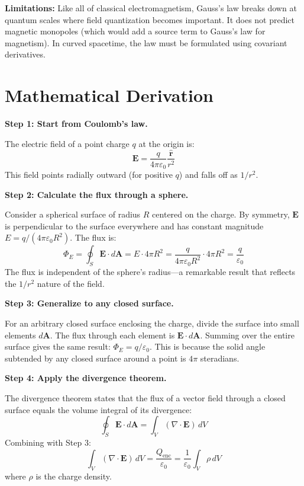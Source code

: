 \textbf{Limitations:} Like all of classical electromagnetism, Gauss's law breaks down at quantum scales where field quantization becomes important. It does not predict magnetic monopoles (which would add a source term to Gauss's law for magnetism). In curved spacetime, the law must be formulated using covariant derivatives.

\section*{Mathematical Derivation}

\textbf{Step 1: Start from Coulomb's law.}

The electric field of a point charge $q$ at the origin is:
\begin{equation}
\mathbf{E} = \frac{q}{4\pi\varepsilon_0} \frac{\mathbf{\hat{r}}}{r^2}
\end{equation}
This field points radially outward (for positive $q$) and falls off as $1/r^2$.

\textbf{Step 2: Calculate the flux through a sphere.}

Consider a spherical surface of radius $R$ centered on the charge. By symmetry, $\mathbf{E}$ is perpendicular to the surface everywhere and has constant magnitude $E = q/(4\pi\varepsilon_0 R^2)$. The flux is:
\begin{equation}
\Phi_E = \oint_S \mathbf{E} \cdot d\mathbf{A} = E \cdot 4\pi R^2 = \frac{q}{4\pi\varepsilon_0 R^2} \cdot 4\pi R^2 = \frac{q}{\varepsilon_0}
\end{equation}
The flux is independent of the sphere's radius---a remarkable result that reflects the $1/r^2$ nature of the field.

\textbf{Step 3: Generalize to any closed surface.}

For an arbitrary closed surface enclosing the charge, divide the surface into small elements $d\mathbf{A}$. The flux through each element is $\mathbf{E} \cdot d\mathbf{A}$. Summing over the entire surface gives the same result: $\Phi_E = q/\varepsilon_0$. This is because the solid angle subtended by any closed surface around a point is $4\pi$ steradians.

\textbf{Step 4: Apply the divergence theorem.}

The divergence theorem states that the flux of a vector field through a closed surface equals the volume integral of its divergence:
\begin{equation}
\oint_S \mathbf{E} \cdot d\mathbf{A} = \int_V (\nabla \cdot \mathbf{E}) \, dV
\end{equation}
Combining with Step 3:
\begin{equation}
\int_V (\nabla \cdot \mathbf{E}) \, dV = \frac{Q_{\text{enc}}}{\varepsilon_0} = \frac{1}{\varepsilon_0}\int_V \rho \, dV
\end{equation}
where $\rho$ is the charge density.

